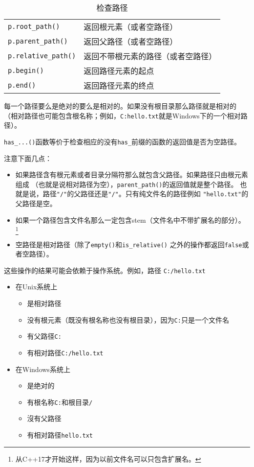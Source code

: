 \begin{table}[htb]
\begin{tabular}{l|l}
        \texttt{p.root\_path()}           & 返回根元素（或者空路径）                \\
        \texttt{p.parent\_path()}         & 返回父路径（或者空路径）                \\
        \texttt{p.relative\_path()}       & 返回不带根元素的路径（或者空路径）           \\
        \texttt{p.begin()}                & 返回路径元素的起点                   \\
        \texttt{p.end()}                  & 返回路径元素的终点                   \\
        \hline
    \end{tabular}
    \caption{检查路径}
    \label{t20.4}
\end{table}

每一个路径要么是绝对的要么是相对的。如果没有根目录那么路径就是相对的
（相对路径也可能包含根名称；例如，\texttt{C:hello.txt}就是Windows下的一个相对路径）。

\texttt{has\_...()}函数等价于检查相应的没有\texttt{has\_}前缀的函数的返回值是否为空路径。

注意下面几点：
\begin{itemize}
    \item 如果路径含有根元素或者目录分隔符那么就包含父路径。如果路径只由根元素组成
    （也就是说相对路径为空），\texttt{parent\_path()}的返回值就是整个路径。
    也就是说，路径\texttt{"/"}的父路径还是\texttt{"/"}。只有纯文件名的路径例如
    \texttt{"hello.txt"}的父路径是空。
    \item 如果一个路径包含文件名那么一定包含stem（文件名中不带扩展名的部分）。
    \footnote{从C++17才开始这样，因为以前文件名可以只包含扩展名。}
    \item 空路径是相对路径（除了\texttt{empty()}和\texttt{is\_relative()}
    之外的操作都返回\texttt{false}或者空路径）。
\end{itemize}
这些操作的结果可能会依赖于操作系统。例如，路径
\texttt{C:/hello.txt}
\begin{itemize}
    \item 在Unix系统上
    \begin{itemize}
        \item 是相对路径
        \item 没有根元素（既没有根名称也没有根目录），因为\texttt{C:}只是一个文件名
        \item 有父路径\texttt{C:}
        \item 有相对路径\texttt{C:/hello.txt}
    \end{itemize}
    \item 在Windows系统上
    \begin{itemize}
        \item 是绝对的
        \item 有根名称\texttt{C:}和根目录\texttt{/}
        \item 沒有父路径
        \item 有相对路径\texttt{hello.txt}
    \end{itemize}
\end{itemize}

